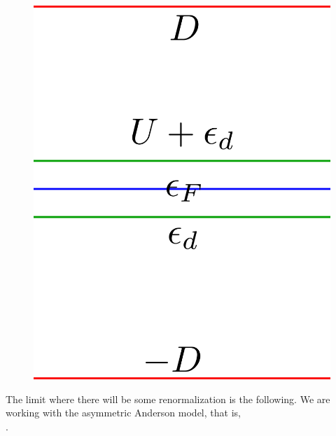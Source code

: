 \documentclass[14pt]{extarticle}
\numberwithin{equation}{section}
\begin{document}
{\begin{figure}
\begin{minipage}{220pt}
       	\label{and1}
\end{minipage}
\begin{minipage}{220pt}
	\centering
       	\includegraphics[scale=0.28]{anderson2.png}
       	\label{and2}
\end{minipage}
\end{figure}
The limit where there will be some renormalization is the following.
We are working with the asymmetric Anderson model, that is,\\ .
}
\end{document}
